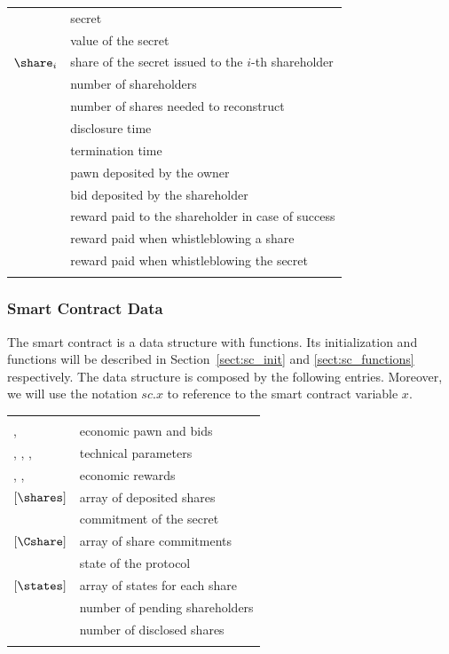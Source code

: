 \begin{tabular}{ll}
	\secret & secret \\
	\V & value of the secret \\
	$\share_{i}$ & share of the secret issued to the $i$-th shareholder \\
	\N & number of shareholders \\
	\K & number of shares needed to reconstruct \secret \\	
	\td & disclosure time \\
	\te & termination time \\
	\PO & pawn deposited by the owner \\
	\BH & bid deposited by the shareholder \\
	\RH & reward paid to the shareholder in case of success \\
	\Wshare & reward paid when whistleblowing a share \\
	\Wsecret & reward paid when whistleblowing the secret \\

	& \\
\end{tabular}

\subsubsection*{Smart Contract Data}
The \shortname smart contract is a data structure with functions. 
Its initialization and functions will be described in Section~\ref{sect:sc_init} and \ref{sect:sc_functions} respectively. The data structure is composed by the following entries.
Moreover, we will use the notation $sc.x$ to reference to the smart contract variable $x$.

\begin{tabular}{ll}
	& \\
	
	\PO, \BH & economic pawn and bids \\
	\td, \te, \N, \K & technical parameters \\
	\RH, \Wsecret, \Wshare & economic rewards \\
	$\left[ \shares \right]$ & array of deposited shares \\
	\Csecret & commitment of the secret \\
	$\left[ \Cshare \right]$ & array of share commitments \\	
	\state & state of the \shortname protocol \\
	$\left[ \states \right]$& array of states for each share \\
	\numpending & number of pending shareholders \\
	\numdisclosed & number of disclosed shares \\
	& \\
\end{tabular}

